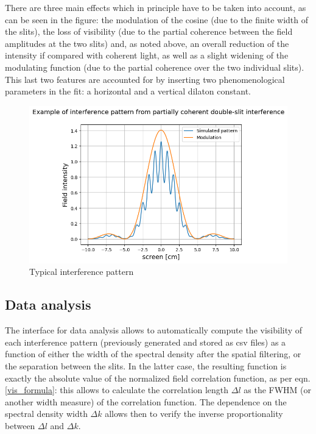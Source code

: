 There are three main effects which in principle have to be taken into account, as can be seen in the figure: 
the modulation of the cosine (due to the finite width of the slits), the loss of visibility (due to the partial coherence between the field amplitudes at the two slits) 
and, as noted above, 
an overall reduction of the intensity if compared with coherent light, as well as a slight widening of the modulating 
function (due to the partial coherence over the two individual slits). This last two features are accounted 
for by inserting two phenomenological parameters in the fit: a horizontal and a vertical dilaton constant.
\begin{figure}[!ht]
    \centering
    \includegraphics[width = .8\textwidth]{Img/output.png}
    \caption{Typical interference pattern}
    \label{patt}
\end{figure}

\subsection{Data analysis}

The interface for data analysis allows to automatically compute the visibility of each interference pattern (previously generated and stored as csv files) as 
a function of either the width of the spectral density after the spatial filtering, or the separation between the slits. In the latter case, the resulting 
function is exactly the absolute value of the normalized field correlation function, as per eqn. \eqref{vis_formula}: this allows to calculate the correlation 
length $\Delta l$ as the FWHM (or another width measure) of the correlation function. The dependence on the spectral density width $\Delta k$ allows then to 
verify the inverse proportionality between $\Delta l$ and $\Delta k$. \\

